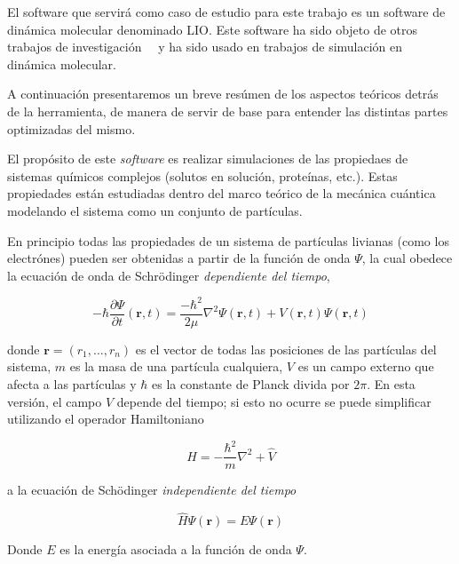 El software que servirá como caso de estudio para este trabajo es un software de 
din\'amica molecular denominado LIO. Este software ha sido objeto de otros 
trabajos de investigación~\cite{PaperNitscheManu}~\cite{TesisNitsche} y ha sido 
usado en trabajos de simulaci\'on en din\'amica molecular.

A continuaci\'on presentaremos un breve res\'umen de los aspectos te\'oricos detr\'as de
la herramienta, de manera de servir de base para entender las distintas partes optimizadas
del mismo.

El prop\'osito de este \textit{software} es realizar simulaciones de las propiedaes
de sistemas qu\'imicos complejos (solutos en soluci\'on, prote\'inas, etc.). Estas
propiedades est\'an estudiadas dentro del marco te\'orico de la mec\'anica cu\'antica
modelando el sistema como un conjunto de part\'iculas.

En principio todas las propiedades de un sistema de part\'iculas livianas
(como los electr\'ones) pueden ser obtenidas a partir de la funci\'on de onda $\Psi$,
la cual obedece la ecuaci\'on de onda de Schr\"odinger \textit{dependiente del tiempo},

\begin{equation}
    \label{schro_time_dep}
    -\hbar\frac{\partial \Psi}{\partial t} (\mathbf{r},t) = \frac{-\hbar^2}{2\mu}\nabla^2 \Psi(\mathbf{r},t) + V(\mathbf{r},t) \Psi(\mathbf{r},t)
\end{equation}

donde $\mathbf{r} = (r_1,\dots,r_n)$ es el vector de todas las posiciones de las part\'iculas del sistema,
$m$ es la masa de una part\'icula cualquiera, $V$ es un campo externo que afecta a las part\'iculas y
$\hbar$ es la constante de Planck divida por $2\pi$. En esta versi\'on, el campo $V$ depende del tiempo; si
esto no ocurre se puede simplificar utilizando el operador Hamiltoniano

\begin{equation*}
    \hat{H} =  -\frac{\hbar^2}{m} \nabla^2 + \hat{V}
\end{equation*}

a la ecuaci\'on de Sch\"odinger \textit{independiente del tiempo}

\begin{equation}
    \label{schro_time_indep}
    \hat{H} \Psi(\mathbf{r}) = E \Psi(\mathbf{r})
\end{equation}

Donde $E$ es la energ\'ia asociada a la funci\'on de onda $\Psi$.

